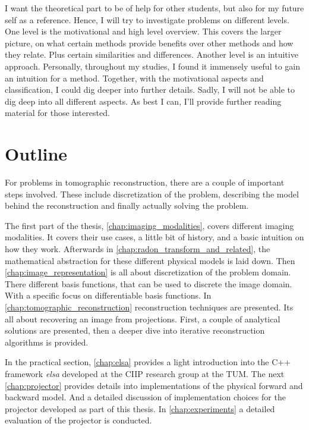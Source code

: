 I want the theoretical part to be of help for other students, but also for my future self as a
reference. Hence, I will try to investigate problems on different levels. One level is the
motivational and high level overview. This covers the larger picture, on what certain methods
provide benefits over other methods and how they relate. Plus certain similarities and differences.
Another level is an intuitive approach. Personally, throughout my studies, I found it immensely
useful to gain an intuition for a method. Together, with the motivational aspects and classification,
I could dig deeper into further details. Sadly, I will not be able to dig deep into all different
aspects. As best I can, I'll provide further reading material for those interested.

\section{Outline}\label{sec:outline}

For problems in tomographic reconstruction, there are a couple of important steps involved. These
include discretization of the problem, describing the model behind the reconstruction and finally
actually solving the problem.

The first part of the thesis, \autoref{chap:imaging_modalities}, covers different imaging
modalities. It covers their use cases, a little bit of history, and a basic intuition on how they
work. Afterwards in \autoref{chap:radon_transform_and_related}, the mathematical abstraction for
these different physical models is laid down. Then \autoref{chap:image_representation} is all about
discretization of the problem domain. There different basis functions, that can be used to discrete
the image domain. With a specific focus on differentiable basis functions. In
\autoref{chap:tomographic_reconstruction} reconstruction techniques are presented. Its all about
recovering an image from projections. First, a couple of analytical solutions are presented, then a
deeper dive into iterative reconstruction algorithms is provided.

In the practical section, \autoref{chap:elsa} provides a light introduction into the C++ framework
\textit{elsa} developed at the \gls{CIIP} research group at the \gls{TUM}. The
next \autoref{chap:projector} provides details into implementations of the physical forward and
backward model. And a detailed discussion of
implementation choices for the projector developed as part of this thesis. In
\autoref{chap:experiments} a detailed evaluation of the projector is conducted.


